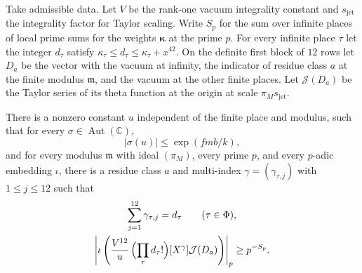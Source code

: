 \begin{lemma}
\label{lem:c-derivative-sharpness}
\label{thm:ch2-sharpness}
\emitthmsource
Take admissible data. Let $V$ be the rank-one vacuum integrality constant and $s_{\mathrm{jet}}$ the integrality factor for Taylor scaling. Write $S_p$ for the sum over infinite places of local prime sums for the weights $\boldsymbol\kappa$ at the prime $p$. For every infinite place $\tau$ let the integer $d_\tau$ satisfy $\kappa_\tau\le d_\tau\le\kappa_\tau+x^{42}$. On the definite first block of $12$ rows let $D_a$ be the vector with the vacuum at infinity, the indicator of residue class $a$ at the finite modulus $\mathfrak m$, and the vacuum at the other finite places. Let $\mathcal J(D_a)$ be the Taylor series of its theta function at the origin at scale $\pi_M s_{\mathrm{jet}}$.

There is a nonzero constant $u$ independent of the finite place and modulus, such that for every $\sigma\in\operatorname{Aut}(\mathbb C)$,
\[
     |\sigma(u)|\le \exp(fmb/k),
\]
and for every modulus $\mathfrak m$ with ideal $(\pi_M)$, every prime $p$, and every $p$-adic embedding $\iota$, there is a residue class $a$ and multi-index $\gamma=(\gamma_{\tau,j})$ with $1\le j\le12$ such that
\begin{equation}
\label{eq:ch2-sharpness}
\begin{gathered}
 \sum_{j=1}^{12}\gamma_{\tau,j}=d_\tau\qquad(\tau\in\Phi),\\
 \left|\iota\left(\frac{V^{12}}{u}\,
       \Bigl(\prod_\tau d_\tau!\Bigr)
       [X^\gamma]\mathcal J(D_a)\right)\right|_p
 \ge p^{-S_p}.
\end{gathered}
\end{equation}
\end{lemma}

